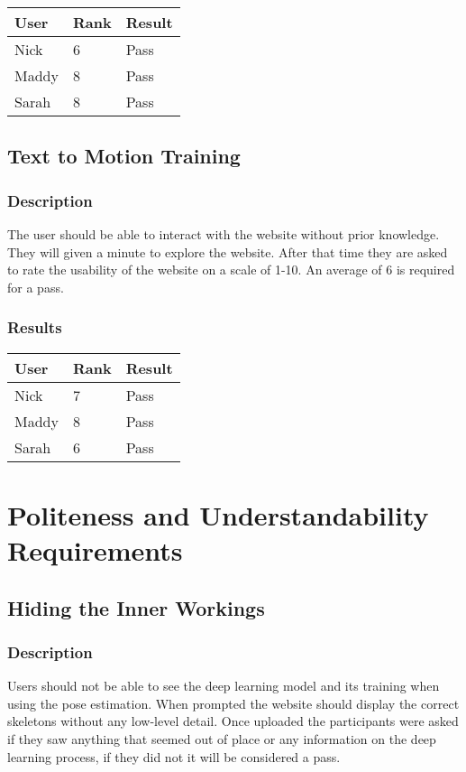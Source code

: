 \documentclass{scrreprt}
\begin{document}
 \centering
 \begin{tabular}{||p{2.5cm}|p{2.5cm}|p{2.5cm}||}
 \hline
 \bf User & \bf Rank & \bf Result\\
 \hline\hline
 Nick & 6 & Pass \\
 \hline
 Maddy & 8 & Pass \\ 
 \hline
 Sarah & 8 & Pass\\
 \hline
 \end{tabular}

\subsection{Text to Motion Training }
\subsubsection{Description}
\begin{flushleft}
The user should be able to interact with the website without prior knowledge. They will given a minute to explore the website. After that time they are asked to rate the usability of the website on a scale of 1-10. An average of 6 is required for a pass.
\subsubsection{Results}
\end{flushleft}

 \centering
 \begin{tabular}{||p{2.5cm}|p{2.5cm}|p{2.5cm}||}
 \hline
 \bf User & \bf Rank & \bf Result\\
 \hline\hline
 Nick & 7 & Pass \\
 \hline
 Maddy & 8 & Pass \\ 
 \hline
 Sarah & 6 & Pass\\
 \hline
 \end{tabular}

\section{Politeness and Understandability Requirements}
\subsection{Hiding the Inner Workings}
\subsubsection{Description}
\begin{flushleft}
Users should not be able to see the deep learning model and its training when using the pose estimation. When prompted the website should display the correct skeletons without any low-level detail. Once uploaded the participants were asked if they saw anything that seemed out of place or any information on the deep learning process, if they did not it will be considered a pass.
\end{flushleft}
\end{document}
